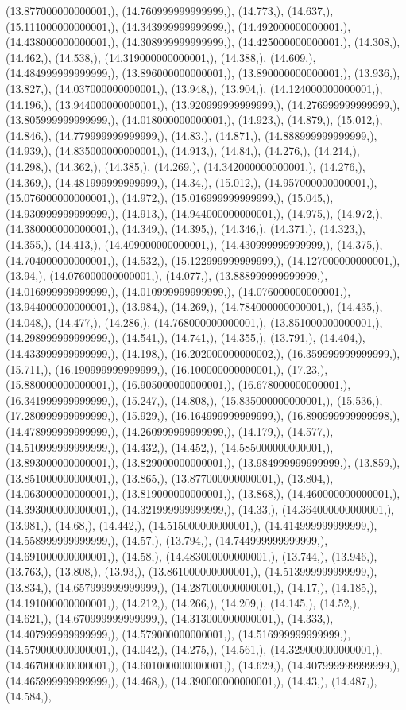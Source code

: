 \documentclass{article}
\begin{document}
(13.877000000000001,), (14.760999999999999,), (14.773,), (14.637,), (15.111000000000001,), (14.343999999999999,), (14.492000000000001,), (14.438000000000001,), (14.308999999999999,), (14.425000000000001,), (14.308,), (14.462,), (14.538,), (14.319000000000001,), (14.388,), (14.609,), (14.484999999999999,), (13.896000000000001,), (13.890000000000001,), (13.936,), (13.827,), (14.037000000000001,), (13.948,), (13.904,), (14.124000000000001,), (14.196,), (13.944000000000001,), (13.920999999999999,), (14.276999999999999,), (13.805999999999999,), (14.018000000000001,), (14.923,), (14.879,), (15.012,), (14.846,), (14.779999999999999,), (14.83,), (14.871,), (14.888999999999999,), (14.939,), (14.835000000000001,), (14.913,), (14.84,), (14.276,), (14.214,), (14.298,), (14.362,), (14.385,), (14.269,), (14.342000000000001,), (14.276,), (14.369,), (14.481999999999999,), (14.34,), (15.012,), (14.957000000000001,), (15.076000000000001,), (14.972,), (15.016999999999999,), (15.045,), (14.930999999999999,), (14.913,), (14.944000000000001,), (14.975,), (14.972,), (14.380000000000001,), (14.349,), (14.395,), (14.346,), (14.371,), (14.323,), (14.355,), (14.413,), (14.409000000000001,), (14.430999999999999,), (14.375,), (14.704000000000001,), (14.532,), (15.122999999999999,), (14.127000000000001,), (13.94,), (14.076000000000001,), (14.077,), (13.888999999999999,), (14.016999999999999,), (14.010999999999999,), (14.076000000000001,), (13.944000000000001,), (13.984,), (14.269,), (14.784000000000001,), (14.435,), (14.048,), (14.477,), (14.286,), (14.768000000000001,), (13.851000000000001,), (14.298999999999999,), (14.541,), (14.741,), (14.355,), (13.791,), (14.404,), (14.433999999999999,), (14.198,), (16.202000000000002,), (16.359999999999999,), (15.711,), (16.190999999999999,), (16.100000000000001,), (17.23,), (15.880000000000001,), (16.905000000000001,), (16.678000000000001,), (16.341999999999999,), (15.247,), (14.808,), (15.835000000000001,), (15.536,), (17.280999999999999,), (15.929,), (16.164999999999999,), (16.890999999999998,), (14.478999999999999,), (14.260999999999999,), (14.179,), (14.577,), (14.510999999999999,), (14.432,), (14.452,), (14.585000000000001,), (13.893000000000001,), (13.829000000000001,), (13.984999999999999,), (13.859,), (13.851000000000001,), (13.865,), (13.877000000000001,), (13.804,), (14.063000000000001,), (13.819000000000001,), (13.868,), (14.460000000000001,), (14.393000000000001,), (14.321999999999999,), (14.33,), (14.364000000000001,), (13.981,), (14.68,), (14.442,), (14.515000000000001,), (14.414999999999999,), (14.558999999999999,), (14.57,), (13.794,), (14.744999999999999,), (14.691000000000001,), (14.58,), (14.483000000000001,), (13.744,), (13.946,), (13.763,), (13.808,), (13.93,), (13.861000000000001,), (14.513999999999999,), (13.834,), (14.657999999999999,), (14.287000000000001,), (14.17,), (14.185,), (14.191000000000001,), (14.212,), (14.266,), (14.209,), (14.145,), (14.52,), (14.621,), (14.670999999999999,), (14.313000000000001,), (14.333,), (14.407999999999999,), (14.579000000000001,), (14.516999999999999,), (14.579000000000001,), (14.042,), (14.275,), (14.561,), (14.329000000000001,), (14.467000000000001,), (14.601000000000001,), (14.629,), (14.407999999999999,), (14.465999999999999,), (14.468,), (14.390000000000001,), (14.43,), (14.487,), (14.584,), 
\end{document}
